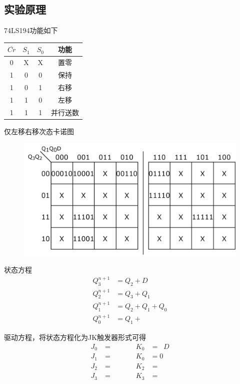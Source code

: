\documentclass[11pt,UTF8]{ctexart}
\newcommand{\ol}[1]{\mathop{\overline{#1}}}%
\begin{document}
\subsection{实验原理}
\par 74LS194功能如下
\begin{table}[H]
  \centering
    \begin{tabular}{|c|c|c|c|}
    \hline
    $\overline{Cr}$    & $S_1$    & $S_0$ & 功能 \bigstrut\\
    \hline
    0     & X & X     & 置零 \bigstrut\\
    \hline
    1     & 0 & 0     & 保持 \bigstrut\\
    \hline
    1     & 0 & 1     & 右移 \bigstrut\\
    \hline
    1     & 1 & 0     & 左移 \bigstrut\\
    \hline
    1 & 1 & 1 & 并行送数\\
    \hline
    \end{tabular}%
\end{table}%
\par 仅左移右移次态卡诺图
\begin{figure}[H]
    \centering
    \includegraphics[width=0.6\linewidth]{fig/ls_and_rs.pdf}
\end{figure}
\par 状态方程
    \[\begin{aligned}
    Q_3^{n+1}&=Q_2+D\\
    Q_2^{n+1}&=Q_3+Q_1\\
    Q_1^{n+1}&=Q_2+Q_1+Q_0\\
    Q_0^{n+1}&=Q_1+\ol{D}
    \end{aligned}\]
\par 驱动方程，将状态方程化为JK触发器形式可得
    \[\begin{aligned}
    J_0&=\ol{\ol{Q_1}D} \qquad &K_0&=\ol{Q_1}D\\
    J_1&=\ol{\ol{Q_2}\ol{Q_0}} \qquad &K_0&=0\\
    J_2&=\ol{\ol{Q_3}\ol{Q_1}} \qquad &K_2&=\ol{Q_3}\ol{Q_1}\\
    J_3&=\ol{\ol{Q_2}\ol{D}} \qquad &K_3&=\ol{Q_2}\ol{D}
    \end{aligned}\]
\end{document}

